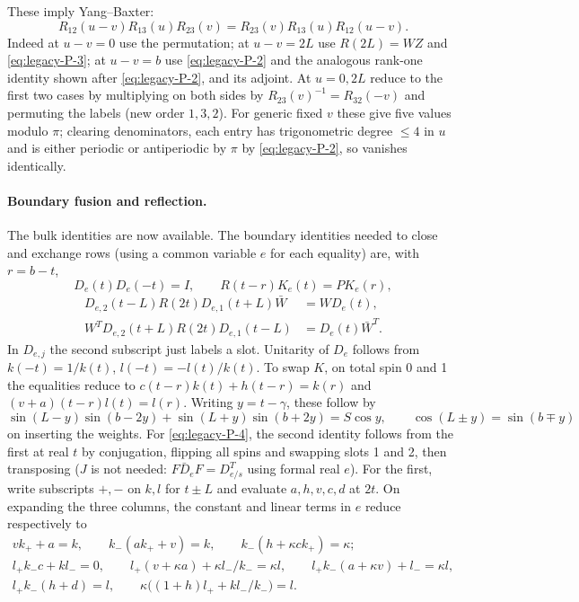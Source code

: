 These imply Yang--Baxter:
\[
 R_{12}(u-v) R_{13}(u) R_{23}(v)=R_{23}(v) R_{13}(u) R_{12}(u-v).
\]
Indeed at $u-v=0$ use the permutation; at $u-v=2L$ use $R(2L)=W Z$ and \eqref{eq:legacy-P-3}; at $u-v=b$ use \eqref{eq:legacy-P-2} and the analogous rank-one identity shown after \eqref{eq:legacy-P-2}, and its adjoint. At $u=0,2L$ reduce to the first two cases by multiplying on both sides by $R_{23}(v)^{-1}=R_{32}(-v)$ and permuting the labels (new order $1,3,2$). For generic fixed $v$ these give five values modulo $\pi$; clearing denominators, each entry has trigonometric degree $\le4$ in $u$ and is either periodic or antiperiodic by $\pi$ by \eqref{eq:legacy-P-2}, so vanishes identically.

\paragraph{Boundary fusion and reflection.}
The bulk identities are now available. The boundary identities needed to close and exchange rows (using a common variable $e$ for each equality) are, with $r=b-t$,
\[
 D_e(t)D_e(-t)=I,\qquad R(t-r) K_e(t)=P K_e(r),
\]
\begin{equation}
 \begin{split}
 D_{e,2}(t-L)R(2t)D_{e,1}(t+L)\bar W&=W D_e(t),\\
 W^T D_{e,2}(t+L)R(2t)D_{e,1}(t-L)&=D_e(t)\bar W^T .
 \end{split}                                                       \label{eq:legacy-P-4}
\end{equation}
In $D_{e,j}$ the second subscript just labels a slot. Unitarity of $D_e$ follows from $k(-t)=1/k(t)$, $l(-t)=-l(t)/k(t)$. To swap $K$, on total spin 0 and 1 the equalities reduce to $c(t-r) k(t)+h(t-r)=k(r)$ and $(v+a)(t-r)l(t)=l(r)$. Writing $y=t-\gamma$, these follow by
\[
 \sin(L-y)\sin(b-2y)+\sin(L+y)\sin(b+2y)=S\cos y,\qquad
 \cos(L\pm y)=\sin(b\mp y)
\]
on inserting the weights. For \eqref{eq:legacy-P-4}, the second identity follows from the first at real $t$ by conjugation, flipping all spins and swapping slots 1 and 2, then transposing ($J$ is not needed: $F\bar D_e F=D^T_{e/s}$ using formal real $e$). For the first, write subscripts $+,-$ on $k,l$ for $t\pm L$ and evaluate $a,h,v,c,d$ at $2t$. On expanding the three columns, the constant and linear terms in $e$ reduce respectively to
\[
 \begin{split}
 v k_+ +a=k,\qquad k_-(a k_+ +v)=k,\qquad k_-(h+\kappa c k_+)=\kappa;\\
 l_+ k_- c+k l_-=0,\qquad l_+(v+\kappa a)+\kappa l_- /k_-=\kappa l,\qquad
 l_+ k_-(a+\kappa v)+l_-=\kappa l,\\
 l_+ k_-(h+d)=l,\qquad \kappa\big((1+h)l_++k l_-/k_-\big)=l .
 \end{split}
\]
